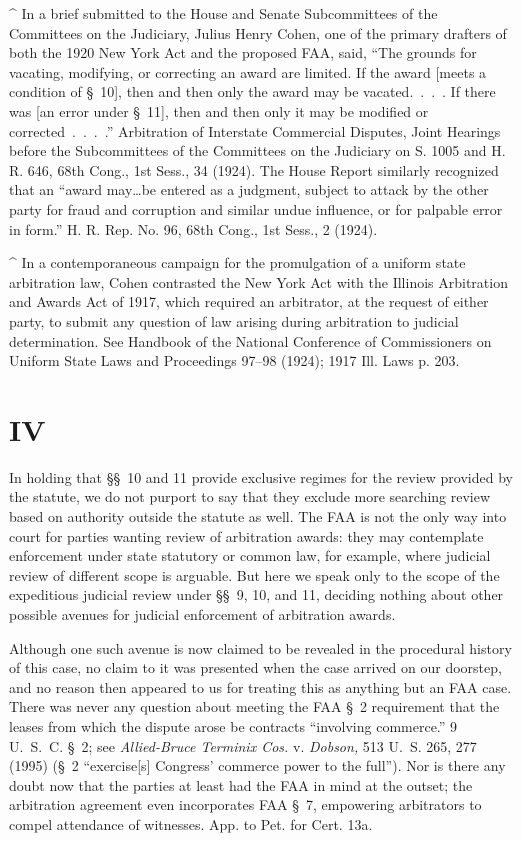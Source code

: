 ^   In a brief submitted to the House and Senate Subcommittees of the
Committees on the Judiciary, Julius Henry Cohen, one of the primary
drafters of both the 1920 New York Act and the proposed FAA, said,
``The grounds for vacating, modifying, or correcting an award are
limited. If the award [meets a condition of \S~10], then and then only
the award may be vacated.~.~.~. If there was [an error under \S~11],
then and then only it may be modified or corrected~.~.~.~.''
Arbitration of Interstate Commercial Disputes, Joint Hearings before
the Subcommittees of the Committees on the Judiciary on S. 1005 and H.
R. 646, 68th Cong., 1st Sess., 34 (1924). The House Report similarly
recognized that an ``award may\dots be entered as a judgment,
subject to attack by the other party for fraud and corruption and
similar undue influence, or for palpable error in form.'' H. R. Rep.
No. 96, 68th Cong., 1st Sess., 2 (1924).

^   In a contemporaneous campaign for the promulgation of a uniform state
arbitration law, Cohen contrasted the New York Act with the Illinois
Arbitration and Awards Act of 1917, which required an arbitrator, at
the re\newpage  quest of either party, to submit any question of law
arising during arbitration to judicial determination. See Handbook
of the National Conference of Commissioners on Uniform State Laws and
Proceedings 97--98 (1924); 1917 Ill. Laws p. 203.

\section{IV}

  In holding that \S\S~10 and 11 provide exclusive regimes for the
review provided by the statute, we do not purport to say that they
exclude more searching review based on authority outside the statute
as well. The FAA is not the only way into court for parties wanting
review of arbitration awards: they may contemplate enforcement under
state statutory or common law, for example, where judicial review of
different scope is arguable. But here we speak only to the scope of the
expeditious judicial review under \S\S~9, 10, and 11, deciding nothing
about other possible avenues for judicial enforcement of arbitration
awards.

  Although one such avenue is now claimed to be revealed in the
procedural history of this case, no claim to it was presented when the
case arrived on our doorstep, and no reason then appeared to us for
treating this as anything but an FAA case. There was never any question
about meeting the FAA \S~2 requirement that the leases from which the
dispute arose be contracts ``involving commerce.'' 9 U.~S.~C.
\S~2; see \emph{Allied-Bruce Terminix Cos.} v. \emph{Dobson,} 513 U.~S.
265, 277 (1995) (\S~2 ``exercise[s] Congress' commerce power to the
full''). Nor is there any doubt now that the parties at least had the
FAA in mind at the outset; the arbitration agreement even incorporates
FAA \S~7, empowering arbitrators to compel attendance of witnesses.
App. to Pet. for Cert. 13a.

